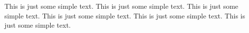 \documentclass{article}
\begin{document}
This is just some simple text. This is just some simple text.
This is just some simple text. This is just some simple text.
This is just some simple text. This is just some simple text.
\end{document}
